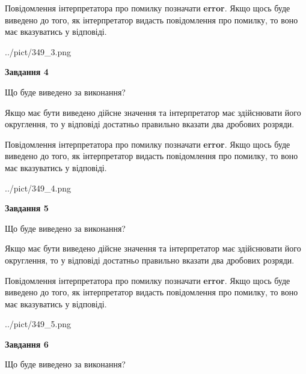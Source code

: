 \documentclass[12pt, ukrainian]{article}
\begin{document}
{\begin {Large}
Повідомлення інтерпретатора про помилку позначати \textbf{error}.
Якщо щось буде виведено до того, як інтерпретатор видасть повідомлення про помилку, 
то воно має вказуватись у відповіді. \par

\begin{center}
	{../pict/349_3.png}
\end{center}
\newpage

{\begin {center}\textbf{Завдання 4}\end {center}}\par
Що буде виведено за виконання? \par

Якщо має бути виведено дійсне значення та інтерпретатор має здійснювати його округлення, 
то у відповіді достатньо правильно вказати два дробових розряди.

Повідомлення інтерпретатора про помилку позначати \textbf{error}.
Якщо щось буде виведено до того, як інтерпретатор видасть повідомлення про помилку, 
то воно має вказуватись у відповіді. \par

\begin{center}
	{../pict/349_4.png}
\end{center}
\newpage

{\begin {center}\textbf{Завдання 5}\end {center}}\par
Що буде виведено за виконання? \par

Якщо має бути виведено дійсне значення та інтерпретатор має здійснювати його округлення, 
то у відповіді достатньо правильно вказати два дробових розряди.

Повідомлення інтерпретатора про помилку позначати \textbf{error}.
Якщо щось буде виведено до того, як інтерпретатор видасть повідомлення про помилку, 
то воно має вказуватись у відповіді. \par

\begin{center}
	{../pict/349_5.png}
\end{center}
\newpage

{\begin {center}\textbf{Завдання 6}\end {center}}\par
Що буде виведено за виконання? \par


\end{Large}}
\end{document}
